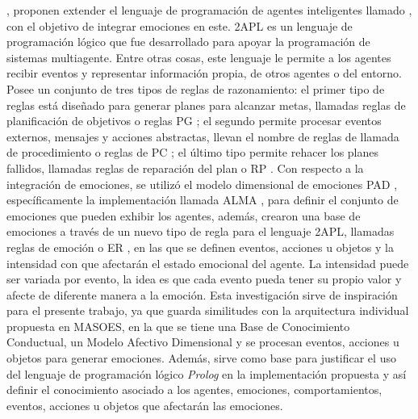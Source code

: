 \cite{dastani2014programming}, proponen extender el lenguaje de programación de agentes inteligentes llamado ,
con el objetivo de integrar emociones en este.
2APL es un lenguaje de programación lógico que fue desarrollado para apoyar la programación de sistemas multiagente.
Entre otras cosas, este lenguaje le permite a los agentes recibir eventos y representar información
propia, de otros agentes o del entorno.
Posee un conjunto de tres tipos de reglas de razonamiento:
el primer tipo de reglas está diseñado para generar planes para alcanzar metas,
llamadas reglas de planificación de objetivos o reglas PG ;
el segundo permite procesar eventos externos, mensajes y acciones abstractas,
llevan el nombre de reglas de llamada de procedimiento o reglas de PC ;
el último tipo permite rehacer los planes fallidos,
llamadas reglas de reparación del plan o RP .
Con respecto a la integración de emociones, se utilizó
el modelo dimensional de emociones PAD ,
específicamente la implementación llamada ALMA  \citep{gebhard2005alma}, para definir
el conjunto de emociones que pueden exhibir los agentes, además,
crearon una base de emociones a través de un nuevo tipo de regla para el lenguaje 2APL,
llamadas reglas de emoción o ER , en las que se definen eventos, acciones u objetos
y la intensidad con que afectarán el estado emocional del agente.
La intensidad puede ser variada por evento,
la idea es que cada evento pueda tener su propio valor
y afecte de diferente manera a la emoción.
Esta investigación sirve de inspiración para el presente trabajo,
ya que guarda similitudes con la arquitectura individual propuesta
en MASOES, en la que se tiene una Base de Conocimiento Conductual,
un Modelo Afectivo Dimensional y se procesan eventos, acciones u objetos para generar emociones.
Además, sirve como base para justificar el uso del
lenguaje de programación lógico \textit{Prolog} en la implementación
propuesta y así definir
el conocimiento asociado a los agentes, emociones,
comportamientos, eventos, acciones u objetos que afectarán las emociones.

